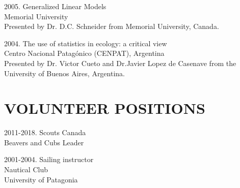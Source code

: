 \documentclass{res}
\begin{document}
\begin{resume}
\begin{hangparas}{.4in}{1}
2005. Generalized Linear Models\\
Memorial University\\
Presented by Dr. D.C. Schneider from Memorial University, Canada.

2004. The use of statistics in ecology: a critical view  \\
Centro Nacional Patag\'{o}nico (CENPAT), Argentina\\
Presented by Dr. Victor Cueto and Dr.Javier Lopez de Casenave from the University of Buenos Aires, Argentina.

\end{hangparas}

\section{VOLUNTEER POSITIONS}
\vspace{0.2in}
\begin{hangparas}{.9in}{1}
2011-2018. Scouts Canada	\\	
Beavers and Cubs Leader

2001-2004. Sailing instructor \\
Nautical Club\\
University of Patagonia
\end{hangparas}


\end{resume}
\end{document}

